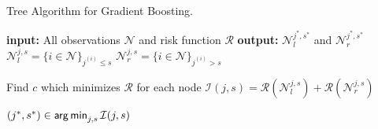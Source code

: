 \begin{algorithm}[H]
  \begin{footnotesize}
  \begin{center}
  \caption{Tree Algorithm for Gradient Boosting.}
    \begin{algorithmic}[1]
      \State \textbf{input: } All observations $\mathcal{N}$ and risk function $\mathcal{R}$
      \State \textbf{output: } $\mathcal{N}_l^{j^\ast, s^\ast}$ and $\mathcal{N}_r^{j^\ast, s^\ast}$
         \State $\mathcal{N}_l^{j,s} = \{ i \in \mathcal{N}\}_{j^{(i)} \leq s}$
            \State $\mathcal{N}_r^{j,s} = \{i \in \mathcal{N}\}_{j^{(i)} > s}$ 
              
            \State Find $c$ which minimizes $\mathcal{R}$ for each node
            \State $\mathcal{I}(j, s) = \mathcal{R}(\mathcal{N}_l^{j,s}) + \mathcal{R}(\mathcal{N}_r^{j,s})$
        \EndFor
        
       
      \EndFor
      \State $(j^\ast, s^\ast) \in \mathop{\sf arg\,min}\nolimits_{j, s} \mathcal{I}(j, s)$
    \end{algorithmic}
    \end{center}
    \end{footnotesize}
\end{algorithm}
